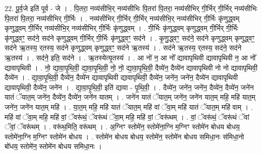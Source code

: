 \documentclass[17pt]{extarticle}
\begin{document}
22. पू॒र्व॒जे इति॑ पूर्व - जे । . पि॒तरा॒ नव्य॑सीभि॒र् नव्य॑सीभिः पि॒तरा॑ पि॒तरा॒ नव्य॑सीभिर् गी॒र्भिर् गी॒र्भिर् नव्य॑सीभिः पि॒तरा॑ पि॒तरा॒ नव्य॑सीभिर् गी॒र्भिः । . नव्य॑सीभिर् गी॒र्भिर् गी॒र्भिर् नव्य॑सीभि॒र् नव्य॑सीभिर् गी॒र्भिः कृ॑णुद्ध्वम् कृणुद्ध्वम् गी॒र्भिर् नव्य॑सीभि॒र् नव्य॑सीभिर् गी॒र्भिः कृ॑णुद्ध्वम् । . गी॒र्भिः कृ॑णुद्ध्वम् कृणुद्ध्वम् गी॒र्भिर् गी॒र्भिः कृ॑णुद्ध्वꣳ॒॒ सद॑ने॒ सद॑ने कृणुद्ध्वम् गी॒र्भिर् गी॒र्भिः कृ॑णुद्ध्वꣳ॒॒ सद॑ने । . कृ॒णु॒द्ध्वꣳ॒॒ सद॑ने॒ सद॑ने कृणुद्ध्वम् कृणुद्ध्वꣳ॒॒ सद॑ने ऋ॒तस्य॒ र्‌तस्य॒ सद॑ने कृणुद्ध्वम् कृणुद्ध्वꣳ॒॒ सद॑ने ऋ॒तस्य॑ । . सद॑ने ऋ॒तस्य॒ र्‌तस्य॒ सद॑ने॒ सद॑ने ऋ॒तस्य॑ । . सद॑ने॒ इति॒ सद॑ने । . ऋ॒तस्येत्यृ॒तस्य॑ । . आ नो॑ न॒ आ नो᳚ द्यावापृथिवी द्यावापृथिवी न॒ आ नो᳚ द्यावापृथिवी । . नो॒ द्या॒वा॒पृ॒थि॒वी॒ द्या॒वा॒पृ॒थि॒वी॒ नो॒ नो॒ द्या॒वा॒पृ॒थि॒वी॒ दैव्ये॑न॒ दैव्ये॑न द्यावापृथिवी नो नो द्यावापृथिवी॒ दैव्ये॑न । . द्या॒वा॒पृ॒थि॒वी॒ दैव्ये॑न॒ दैव्ये॑न द्यावापृथिवी द्यावापृथिवी॒ दैव्ये॑न॒ जने॑न॒ जने॑न॒ दैव्ये॑न द्यावापृथिवी द्यावापृथिवी॒ दैव्ये॑न॒ जने॑न । . द्या॒वा॒पृ॒थि॒वी॒ इति॑ द्यावा - पृ॒थि॒वी॒ । . दैव्ये॑न॒ जने॑न॒ जने॑न॒ दैव्ये॑न॒ दैव्ये॑न॒ जने॑न यातं ॅयात॒म् जने॑न॒ दैव्ये॑न॒ दैव्ये॑न॒ जने॑न यातम् । . जने॑न यातं ॅयात॒म् जने॑न॒ जने॑न यात॒म् महि॒ महि॑ यात॒म् जने॑न॒ जने॑न यात॒म् महि॑ । . या॒त॒म् महि॒ महि॑ यातं ॅयात॒म् महि॑ वां ॅवा॒म् महि॑ यातं ॅयात॒म् महि॑ वाम् । . महि॑ वां ॅवा॒म् महि॒ महि॑ वां॒ ॅवरू॑थं॒ ॅवरू॑थं ॅवा॒म् महि॒ महि॑ वां॒ ॅवरू॑थम् । . वां॒ ॅवरू॑थं॒ ॅवरू॑थं ॅवां ॅवां॒ ॅवरू॑थम् । . वरू॑थ॒मिति॒ वरू॑थम् । . अ॒ग्निꣳ स्तोमे॑न॒ स्तोमे॑ना॒ग्नि म॒ग्निꣳ स्तोमे॑न बोधय बोधय॒ स्तोमे॑ना॒ग्नि म॒ग्निꣳ स्तोमे॑न बोधय । . स्तोमे॑न बोधय बोधय॒ स्तोमे॑न॒ स्तोमे॑न बोधय समिधा॒नः स॑मिधा॒नो बो॑धय॒ स्तोमे॑न॒ स्तोमे॑न बोधय समिधा॒नः । \newline
\end{document}

